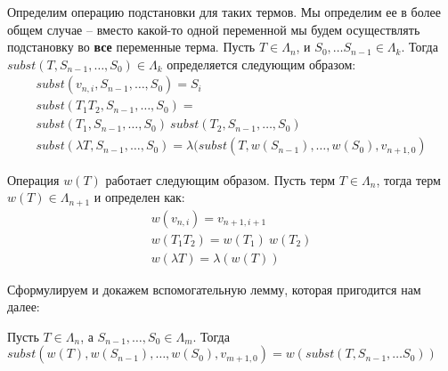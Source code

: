 Определим операцию подстановки для таких термов. Мы определим ее в более общем случае -- вместо какой-то одной переменной мы будем осуществлять подстановку во \textbf{все} переменные терма. Пусть $T \in \Lambda_{n}$, и $S_{0}, \dots S_{n-1} \in \Lambda_{k}$. Тогда $subst(T, S_{n - 1}, \dots, S_{0}) \in \Lambda_{k}$ определяется следующим образом:
\begin{gather*}
  subst(v_{n, i}, S_{n - 1}, \dots, S_{0}) = S_{i} \\
  subst(T_{1} T_{2}, S_{n - 1}, \dots, S_{0}) = \\
  subst(T_{1}, S_{n - 1}, \dots, S_{0})\ subst(T_{2}, S_{n - 1}, \dots, S_{0}) \\
  subst(\lambda T, S_{n - 1}, \dots, S_{0}) = \lambda (subst(T, w(S_{n - 1}), \dots, w(S_{0}), v_{n+1, 0})
\end{gather*}

Операция $w(T)$ работает следующим образом. Пусть терм $T \in \Lambda_{n}$, тогда терм $w(T) \in \Lambda_{n+1}$ и определен как:
\begin{gather*}
  w(v_{n, i}) = v_{n+1, i+1} \\
  w(T_{1} T_{2}) = w(T_1)\ w(T_2) \\
  w(\lambda T) = \lambda (w(T))
\end{gather*}

Сформулируем и докажем вспомогательную лемму, которая пригодится нам далее:
\begin{lemma}
  \label{index:weak_lemma}
  Пусть $T \in \Lambda_{n}$, а $S_{n-1}, \dots, S_{0} \in \Lambda_{m}$. Тогда $subst(w(T), w(S_{n-1}), \dots, w(S_{0}), v_{m+1, 0}) = w(subst(T, S_{n-1}, \dots S_{0}))$
\end{lemma}

